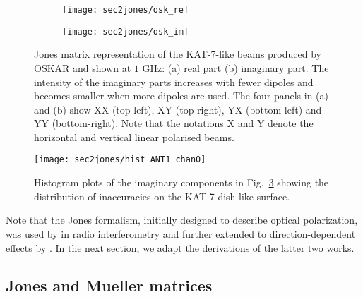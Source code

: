 \begin{figure}[H]
     \centering
     \begin{subfigure}[b]{0.7\textwidth}
         \centering
         \texttt{[image: sec2jones/osk\_re]}
         \caption{}
         \label{fig:osk_re}
     \end{subfigure}
     \hfill
     \begin{subfigure}[b]{0.7\textwidth}
         \centering
         \texttt{[image: sec2jones/osk\_im]}
         \caption{}
         \label{fig:osk_im}
     \end{subfigure}
     \caption{Jones matrix representation of the KAT-7-like beams produced by OSKAR and shown at $1$ GHz: (a) real part (b) imaginary part. 
        The intensity of the imaginary parts increases with fewer dipoles and becomes smaller when more dipoles are used. The four panels in (a) and (b) show
        XX (top-left), XY (top-right), YX (bottom-left) and YY (bottom-right). Note that the notations X and Y denote the horizontal and vertical linear polarised beams.}\label{fig:jns}
\end{figure}
\FloatBarrier
 \begin{figure}
\begin{minipage}[H]{\linewidth}
      \centering
      \texttt{[image: sec2jones/hist\_ANT1\_chan0]} %
    \end{minipage}
    \vspace*{-10mm}
     \caption{Histogram plots of the imaginary components in Fig.~\ref{fig:jns} showing the distribution of inaccuracies on the KAT-7 dish-like surface.}     	    \label{fig:err}
    \end{figure}
    \FloatBarrier
 

Note that the Jones \citep{1948JOSA...38..671J, 1942JOSA...32..486J} formalism, initially designed to describe optical polarization, was used 
by \cite{1996A&AS..117..137H} in radio interferometry  and further extended to direction-dependent effects by \cite{2011A&A...527A.106S}. In the next section,
we adapt the derivations of the latter two works.

\subsection{Jones and Mueller matrices}       \label{sec:mueller}

